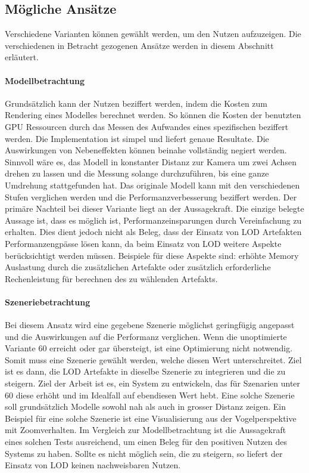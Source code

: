 \subsection{Mögliche Ansätze}

Verschiedene Varianten können gewählt werden, um den Nutzen aufzuzeigen. Die verschiedenen in Betracht gezogenen Ansätze werden in diesem Abschnitt erläutert.

\paragraph{Modellbetrachtung}
Grundsätzlich kann der Nutzen beziffert werden, indem die Kosten zum Rendering eines Modelles berechnet werden. So können die Kosten der benutzten GPU Ressourcen durch das Messen des Aufwandes eines spezifischen  beziffert werden. Die Implementation ist simpel und liefert genaue Resultate. Die Auswirkungen von Nebeneffekten können beinahe vollständig negiert werden.
Sinnvoll wäre es, das Modell in konstanter Distanz zur Kamera um zwei Achsen drehen zu lassen und die Messung solange durchzuführen, bis eine ganze Umdrehung stattgefunden hat. Das originale Modell kann mit den verschiedenen Stufen verglichen werden und die Performanzverbesserung beziffert werden.
Der primäre Nachteil bei dieser Variante liegt an der Aussagekraft. Die einzige belegte Aussage ist, dass es möglich ist, Performanzeinsparungen durch Vereinfachung zu erhalten. Dies dient jedoch nicht als Beleg, dass der Einsatz von LOD Artefakten Performanzengpässe lösen kann, da beim Einsatz von LOD weitere Aspekte berücksichtigt werden müssen. Beispiele für diese Aspekte sind: erhöhte Memory Auslastung durch die zusätzlichen Artefakte oder zusätzlich erforderliche Rechenleistung für berechnen des zu wählenden Artefakts. 

\paragraph{Szeneriebetrachtung}
Bei diesem Ansatz wird eine gegebene Szenerie möglichst geringfügig angepasst und die Auswirkungen auf die Performanz verglichen.
Wenn die unoptimierte Variante 60  erreicht oder gar übersteigt, ist eine Optimierung nicht notwendig. Somit muss eine Szenerie gewählt werden, welche diesen Wert unterschreitet.
Ziel ist es dann, die LOD Artefakte in dieselbe Szenerie zu integrieren und die  zu steigern. Ziel der Arbeit ist es, ein System zu entwickeln, das für Szenarien unter 60  diese erhöht und im Idealfall auf ebendiesen Wert hebt.
Eine solche Szenerie soll grundsätzlich Modelle sowohl nah als auch in grosser Distanz zeigen. Ein Beispiel für eine solche Szenerie ist eine Visualisierung aus der Vogelperspektive mit Zoomverhalten.
Im Vergleich zur Modellbetrachtung ist die Aussagekraft eines solchen Tests ausreichend, um einen Beleg für den positiven Nutzen des Systems zu haben. Sollte es nicht möglich sein, die  zu steigern, so liefert der Einsatz von LOD keinen nachweisbaren Nutzen.
